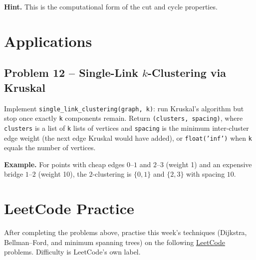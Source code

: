 \documentclass[11pt]{article}
\begin{document}
\textbf{Hint.} This is the computational form of the cut and cycle properties.

\newpage
\section{Applications}

\subsection*{Problem 12 -- Single-Link $k$-Clustering via Kruskal}

Implement \texttt{single\_link\_clustering(graph, k)}: run Kruskal's algorithm but stop
once exactly \texttt{k} components remain. Return \texttt{(clusters, spacing)}, where
\texttt{clusters} is a list of \texttt{k} lists of vertices and \texttt{spacing} is the
minimum inter-cluster edge weight (the next edge Kruskal would have added), or
\texttt{float('inf')} when \texttt{k} equals the number of vertices.

\textbf{Example.} For points with cheap edges $0$--$1$ and $2$--$3$ (weight 1) and an
expensive bridge $1$--$2$ (weight 10), the $2$-clustering is $\{0,1\}$ and $\{2,3\}$ with
spacing $10$.

\newpage
\section{LeetCode Practice}

After completing the problems above, practise this week's techniques (Dijkstra,
Bellman--Ford, and minimum spanning trees) on the following
\href{https://leetcode.com}{LeetCode} problems. Difficulty is LeetCode's own label.
\end{document}
